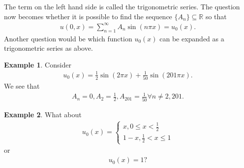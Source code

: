 \documentclass{book}
\theoremstyle{definition}
\newtheorem{exmp}{Example}[section]
\newcommand{\R}{\mathbb{R}}
\begin{document}
The term on the left hand side is called the trigonometric series. The question now becomes whether it is possible to find the sequence $\{ A_n\} \subseteq \R$ so that
\begin{align*}
u(0,x) = \sum_{n=1}^\infty A_n \sin (n \pi x) = u_0(x).
\end{align*}
Another question would be which function $u_0(x)$ can be expanded as a trigonometric series as above.

\begin{exmp}
	Consider
	\begin{align*}
	u_0(x) = \frac{1}{2}\sin(2\pi x) + \frac{1}{50}\sin(201\pi x).
	\end{align*}
	We see that
	\begin{align*}
	A_n = 0, A_2 = \frac{1}{2}, A_{201} = \frac{1}{50} \forall n\neq 2,201.
	\end{align*}
\end{exmp}

\begin{exmp}
	What about
	\begin{align*}
	u_0(x) = \begin{cases}
	x, 0\leq x < \frac{1}{2}\\
	1-x, \frac{1}{2} < x \leq 1
	\end{cases}
	\end{align*}
	or
	\begin{align*}
	u_0(x) = 1?
	\end{align*}
\end{exmp}
\end{document}
